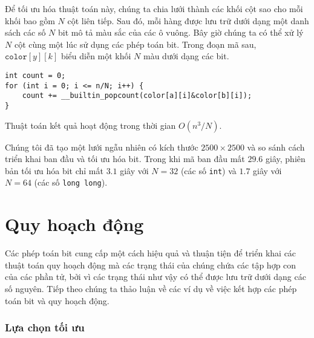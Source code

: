 Để tối ưu hóa thuật toán này, chúng ta chia lưới thành các khối
cột sao cho mỗi khối bao gồm $N$
cột liên tiếp. Sau đó, mỗi hàng được lưu trữ dưới dạng
một danh sách các số $N$ bit mô tả màu sắc
của các ô vuông. Bây giờ chúng ta có thể xử lý $N$ cột cùng một lúc
sử dụng các phép toán bit. Trong đoạn mã sau,
$\texttt{color}[y][k]$ biểu diễn
một khối $N$ màu dưới dạng các bit.
\begin{lstlisting}
int count = 0;
for (int i = 0; i <= n/N; i++) {
    count += __builtin_popcount(color[a][i]&color[b][i]);
}
\end{lstlisting}
Thuật toán kết quả hoạt động trong thời gian $O(n^3/N)$.

Chúng tôi đã tạo một lưới ngẫu nhiên có kích thước $2500 \times 2500$
và so sánh cách triển khai ban đầu và tối ưu hóa bit.
Trong khi mã ban đầu mất $29.6$ giây,
phiên bản tối ưu hóa bit chỉ mất $3.1$ giây
với $N=32$ (các số \texttt{int}) và $1.7$ giây
với $N=64$ (các số \texttt{long long}).

\section{Quy hoạch động}

Các phép toán bit cung cấp một cách hiệu quả và thuận tiện
để triển khai các thuật toán quy hoạch động
mà các trạng thái của chúng chứa các tập hợp con của các phần tử,
bởi vì các trạng thái như vậy có thể được lưu trữ dưới dạng các số nguyên.
Tiếp theo chúng ta thảo luận về các ví dụ về việc kết hợp
các phép toán bit và quy hoạch động.

\subsubsection{Lựa chọn tối ưu}

